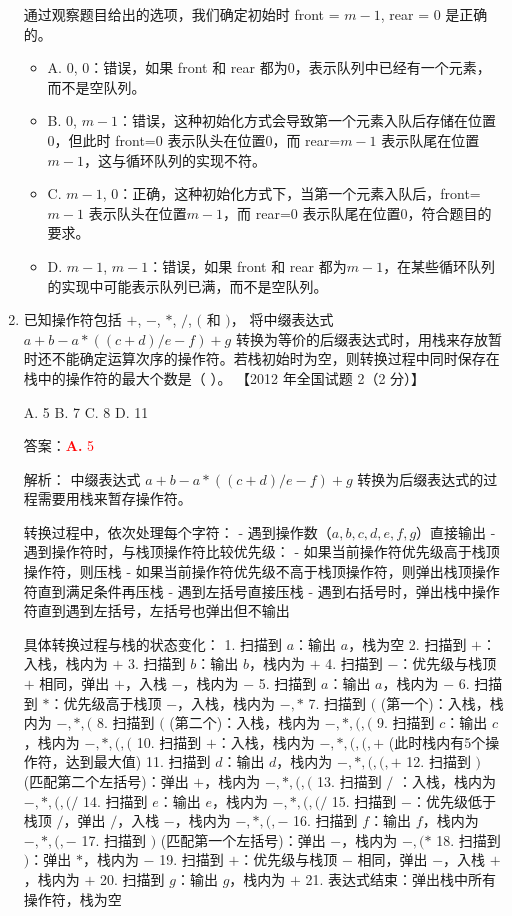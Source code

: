 \documentclass[lang=cn,newtx,10pt,scheme=chinese]{../../../elegantbook}
\begin{document}
\begin{enumerate}
    通过观察题目给出的选项，我们确定初始时 front = $m-1$, rear = 0 是正确的。

    \begin{itemize}
        \item A. 0, 0：错误，如果 front 和 rear 都为0，表示队列中已经有一个元素，而不是空队列。
        \item B. 0, $m-1$：错误，这种初始化方式会导致第一个元素入队后存储在位置0，但此时 front=0 表示队头在位置0，而 rear=$m-1$ 表示队尾在位置$m-1$，这与循环队列的实现不符。
        \item C. $m-1$, 0：正确，这种初始化方式下，当第一个元素入队后，front=$m-1$ 表示队头在位置$m-1$，而 rear=0 表示队尾在位置0，符合题目的要求。
        \item D. $m-1$, $m-1$：错误，如果 front 和 rear 都为$m-1$，在某些循环队列的实现中可能表示队列已满，而不是空队列。
    \end{itemize}

    \item 已知操作符包括 $+$, $-$, $*$, $/$, $($ 和 $)$，
    将中缀表达式 $a+b-a*((c+d)/e-f)+g$ 转换为等价的后缀表达式时，用栈来存放暂时还不能确定运算次序的操作符。若栈初始时为空，则转换过程中同时保存在栈中的操作符的最大个数是（ ）。  
    【2012 年全国试题 2（2 分）】

    A. 5 \quad B. 7 \quad C. 8 \quad D. 11  

    答案：\textcolor{red}{\textbf{A.} 5}

    解析：
    中缀表达式 $a+b-a*((c+d)/e-f)+g$ 转换为后缀表达式的过程需要用栈来暂存操作符。

    转换过程中，依次处理每个字符：
    - 遇到操作数（$a,b,c,d,e,f,g$）直接输出
    - 遇到操作符时，与栈顶操作符比较优先级：
      - 如果当前操作符优先级高于栈顶操作符，则压栈
      - 如果当前操作符优先级不高于栈顶操作符，则弹出栈顶操作符直到满足条件再压栈
    - 遇到左括号直接压栈
    - 遇到右括号时，弹出栈中操作符直到遇到左括号，左括号也弹出但不输出

    具体转换过程与栈的状态变化：
    1. 扫描到 $a$：输出 $a$，栈为空
    2. 扫描到 $+$：入栈，栈内为 $+$
    3. 扫描到 $b$：输出 $b$，栈内为 $+$
    4. 扫描到 $-$：优先级与栈顶 $+$ 相同，弹出 $+$，入栈 $-$，栈内为 $-$
    5. 扫描到 $a$：输出 $a$，栈内为 $-$
    6. 扫描到 $*$：优先级高于栈顶 $-$，入栈，栈内为 $-,*$
    7. 扫描到 $($ (第一个)：入栈，栈内为 $-,*,($ 
    8. 扫描到 $($ (第二个)：入栈，栈内为 $-,*,(,($ 
    9. 扫描到 $c$：输出 $c$，栈内为 $-,*,(,($ 
    10. 扫描到 $+$：入栈，栈内为 $-,*,(,(,+$ (此时栈内有5个操作符，达到最大值)
    11. 扫描到 $d$：输出 $d$，栈内为 $-,*,(,(,+$ 
    12. 扫描到 $)$ (匹配第二个左括号)：弹出 $+$，栈内为 $-,*,(,($
    13. 扫描到 $/$ ：入栈，栈内为 $-,*,(,(/$ 
    14. 扫描到 $e$：输出 $e$，栈内为 $-,*,(,(/$ 
    15. 扫描到 $-$：优先级低于栈顶 $/$，弹出 $/$，入栈 $-$，栈内为 $-,*,(,-$
    16. 扫描到 $f$：输出 $f$，栈内为 $-,*,(,-$
    17. 扫描到 $)$ (匹配第一个左括号)：弹出 $-$，栈内为 $-,(*$
    18. 扫描到 $)$：弹出 $*$，栈内为 $-$
    19. 扫描到 $+$：优先级与栈顶 $-$ 相同，弹出 $-$，入栈 $+$，栈内为 $+$
    20. 扫描到 $g$：输出 $g$，栈内为 $+$
    21. 表达式结束：弹出栈中所有操作符，栈为空


\end{enumerate}
\end{document}
